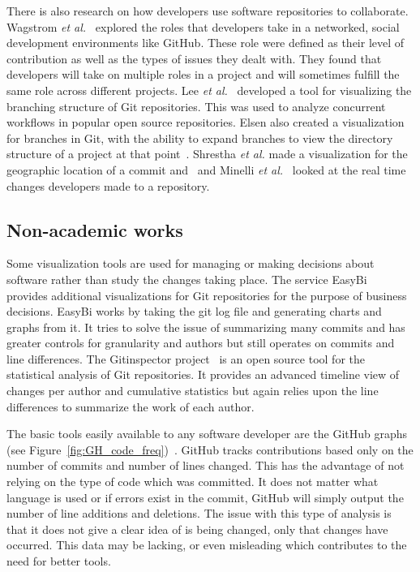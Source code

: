 There is also research on how developers use software repositories to collaborate. Wagstrom \textit{et al.}~\cite{Patrick:Wagstrom:2012} explored the roles that developers take in a networked, social development environments like GitHub. These role were defined as their level of contribution as well as the types of issues they dealt with. They found that developers will take on multiple roles in a project and will sometimes fulfill the same role across different projects. Lee \textit{et al.}~\cite{lee2013} developed a tool for visualizing the branching structure of Git repositories. This was used to analyze concurrent workflows in popular open source repositories. Elsen also created a visualization for branches in Git, with the ability to expand branches to view the directory structure of a project at that point~\cite{6650522}.   Shrestha \textit{et al.} made a visualization for the geographic location of a commit and~\cite{6650532} and Minelli \textit{et al.}~\cite{6980226} looked at the real time changes developers made to a repository.

\subsection{Non-academic works}

Some visualization tools are used for managing or making decisions about software rather than study the changes taking place. The service EasyBi~\cite{EasyBi} provides additional visualizations for Git repositories for the purpose of business decisions. EasyBi works by taking the git log file and generating charts and graphs from it. It tries to solve the issue of summarizing many commits and has greater controls for granularity and authors but still operates on commits and line differences. The Gitinspector project~\cite{Gitinspector} is an open source tool for the statistical analysis of Git repositories. It provides an advanced timeline view of changes per author and cumulative statistics but again relies upon the line differences to summarize the work of each author.

The basic tools easily available to any software developer are the GitHub graphs (see Figure~\ref{fig:GH_code_freq})~\cite{github-graphs}. GitHub tracks contributions based only on the number of commits and number of lines changed. This has the advantage of not relying on the type of code which was committed. It does not matter what language is used or if errors exist in the commit, GitHub will simply output the number of line additions and deletions. The issue with this type of analysis is that it does not give a clear idea of is being changed, only that changes have occurred. This data may be lacking, or even misleading which contributes to the need for better tools.

